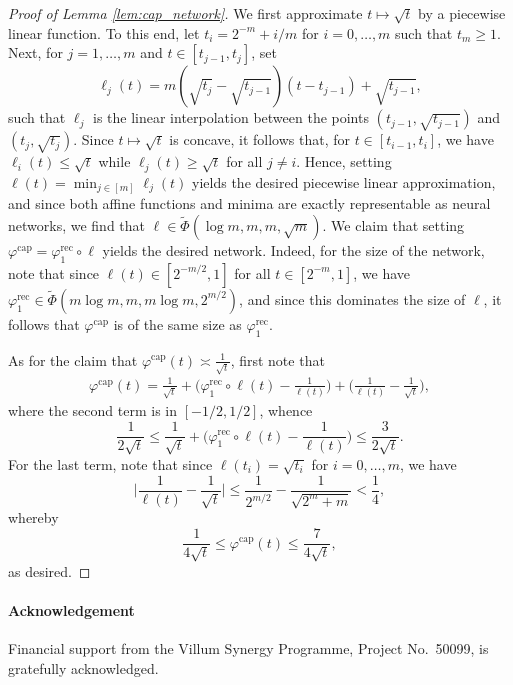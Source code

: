 \documentclass[a4paper, 11pt, headings = small, abstract]{scrartcl}
\begin{document}
\begin{proof}[Proof of Lemma \ref{lem:cap_network}]
	We first approximate $t\mapsto\sqrt{t}$ by a piecewise linear function.
	To this end, let $t_i=2^{-m}+i/m$ for $i=0,\ldots,m$ such that $t_m\ge1$.
	Next, for $j=1,\ldots,m$ and $t\in[t_{j-1}, t_j]$, set
	\[
		\ell_j(t)
		=m(\sqrt{t_j}-\sqrt{t_{j-1}})(t-t_{j-1})+\sqrt{t_{j-1}},
	\]
	such that $\ell_j$ is the linear interpolation between the points $(t_{j-1}, \sqrt{t_{j-1}})$ and $(t_j, \sqrt{t_j})$.
	Since $t\mapsto\sqrt{t}$ is concave, it follows that, for $t\in[t_{i-1}, t_i]$, we have $\ell_i(t)\le\sqrt{t}$ while $\ell_j(t)\ge\sqrt{t}$ for all $j\neq i$.
	Hence, setting $\ell(t)=\min_{j\in[m]}\ell_j(t)$ yields the desired piecewise linear approximation, and since both affine functions and minima are exactly representable as neural networks, we find that $\ell\in\widetilde{\Phi}(\log m, m, m, \sqrt{m})$.
	We claim that setting $\varphi^{\mathrm{cap}}=\varphi^{\mathrm{rec}}_1\circ\ell$ yields the desired network.
	Indeed, for the size of the network, note that since $\ell(t)\in[2^{-m/2}, 1]$ for all $t\in[2^{-m}, 1]$, we have $\varphi^{\mathrm{rec}}_{1}\in\widetilde{\Phi}(m\log m, m, m\log m, 2^{m/2})$, and since this dominates the size of $\ell$, it follows that $\varphi^{\mathrm{cap}}$ is of the same size as $\varphi_1^{\mathrm{rec}}$.

	As for the claim that $\varphi^{\mathrm{cap}}(t)\asymp\frac{1}{\sqrt{t}}$, first note that
	\begin{align*}
		\varphi^{\mathrm{cap}}(t)
		=\frac{1}{\sqrt{t}}
		+\Big(\varphi^{\mathrm{rec}}_1\circ\ell(t)-\frac{1}{\ell(t)}\Big)
		+\Big(\frac{1}{\ell(t)}-\frac{1}{\sqrt{t}}\Big),
	\end{align*}
	where the second term is in $[-1/2, 1/2]$, whence
	\[
		\frac{1}{2\sqrt{t}}
		\le\frac{1}{\sqrt{t}}+\Big(\varphi^{\mathrm{rec}}_1\circ\ell(t)-\frac{1}{\ell(t)}\Big)
		\le\frac{3}{2\sqrt{t}}.
	\]
	For the last term, note that since $\ell(t_i)=\sqrt{t_i}$ for $i=0,\ldots,m$, we have
	\[
		\Big|\frac{1}{\ell(t)}-\frac{1}{\sqrt{t}}\Big|
		\le\frac{1}{2^{m/2}}-\frac{1}{\sqrt{2^m+m}}
		<\frac{1}{4},
	\]
	whereby
	\[
		\frac{1}{4\sqrt{t}}
		\le\varphi^{\mathrm{cap}}(t)
		\le\frac{7}{4\sqrt{t}},
	\]
	as desired.
\end{proof}

\paragraph{Acknowledgement}
Financial support from the Villum Synergy Programme, Project
No.\ 50099, is gratefully acknowledged.



\printbibliography
\end{document}
